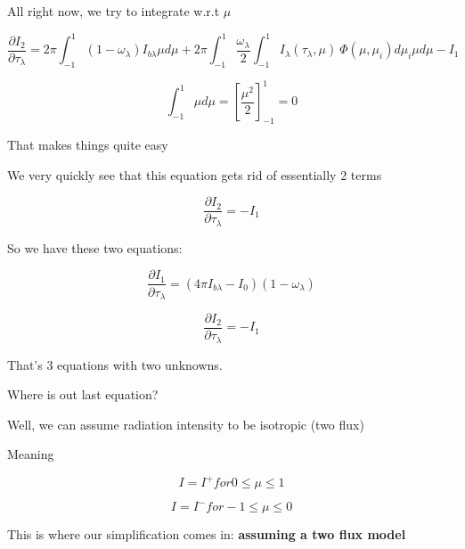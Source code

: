 \documentclass[12pt]{article}
\renewcommand{\_}{\kern-1.5pt\textunderscore\kern-1.5pt}
\begin{document}
\begin{itemize}
\vspace{\baselineskip}
All right now, we try to integrate w.r.t  \(  \mu  \) \par

 \[ \frac{ \partial I_{2}}{ \partial  \tau_{ \lambda }}=2 \pi  \int _{-1}^{1} \left( 1- \omega _{ \lambda } \right) I_{b \lambda }  \mu  d \mu +2 \pi  \int _{-1}^{1}\frac{ \omega _{ \lambda }}{2} \int _{-1}^{1}I_{ \lambda } \left(  \tau_{ \lambda }, \mu  \right) ~ \Phi  \left(  \mu , \mu _{i} \right) d \mu _{i} \mu  d \mu -I_{1} \] \par

 \[  \int _{-1}^{1}  \mu  d \mu = \left[ \frac{ \mu ^{2}}{2} \right] _{-1}^{1}=0 \] \par

That makes things quite easy\par

We very quickly see that this equation gets rid of essentially 2 terms\par

 \[ \frac{ \partial I_{2}}{ \partial  \tau_{ \lambda }}=-I_{1} \] \par

So we have these two equations:\par

 \[ \frac{ \partial I_{1}}{ \partial  \tau_{ \lambda }}= \left( 4 \pi I_{b \lambda }-I_{0} \right)  \left( 1- \omega _{ \lambda } \right)  \] \par

 \[ \frac{ \partial I_{2}}{ \partial  \tau_{ \lambda }}=-I_{1} \] \par

That’s 3 equations with two unknowns.\par

Where is out last equation?\par

Well, we can assume radiation intensity to be isotropic (two flux)\par

Meaning \par

 \[ I=I^{+} for 0 \leq  \mu  \leq 1 \] \par

 \[ I=I^{-} for-1 \leq  \mu  \leq 0 \] \par

This is where our simplification comes in: \textbf{assuming a two flux model}\par


\end{itemize}
\end{document}
